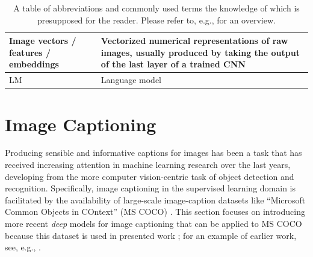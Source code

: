 \begin{table}[]
\begin{tabularx}{\textwidth}{|X|X|}
		Image vectors / features / embeddings & Vectorized numerical representations of raw images, usually produced by taking the output of the last layer of a trained CNN \\ \hline
		LM 						& Language model \parencite{jurafsky2000speech} \\ \hline
	\end{tabularx}
\caption{\label{tab:defs}A table of abbreviations and commonly used terms the knowledge of which is presupposed for the reader. Please refer to, e.g., \cite{goodfellow2016deep} for an overview.}

\end{table}


\section{Image Captioning}
\label{image_captioning}
Producing sensible and informative captions for images has been a task that has received increasing attention in machine learning research over the last years, developing from the more computer vision-centric task of object detection and recognition. Specifically, image captioning in the supervised learning domain is facilitated by the availability of large-scale image-caption datasets like ``Microsoft Common Objects in COntext'' (MS COCO) \parencite{lin2014microsoft, chen2015microsoft}. %
This section focuses on introducing more recent \textit{deep} models for image captioning that can be applied to MS COCO because this dataset is used in presented work \parencite{lecun2015deep}; for an example of earlier work, see, e.g., \cite{kulkarni2013babytalk}.

